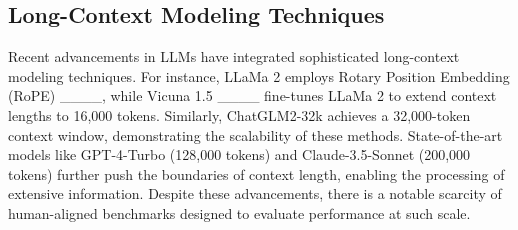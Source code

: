 




\subsection{Long-Context Modeling Techniques}
Recent advancements in LLMs have integrated sophisticated long-context modeling techniques. For instance, LLaMa 2 employs Rotary Position Embedding (RoPE) ____, while Vicuna 1.5 ____ fine-tunes LLaMa 2 to extend context lengths to 16,000 tokens. Similarly, ChatGLM2-32k achieves a 32,000-token context window, demonstrating the scalability of these methods. State-of-the-art models like GPT-4-Turbo (128,000 tokens) and Claude-3.5-Sonnet (200,000 tokens) further push the boundaries of context length, enabling the processing of extensive information. Despite these advancements, there is a notable scarcity of human-aligned benchmarks designed to evaluate performance at such scale.
